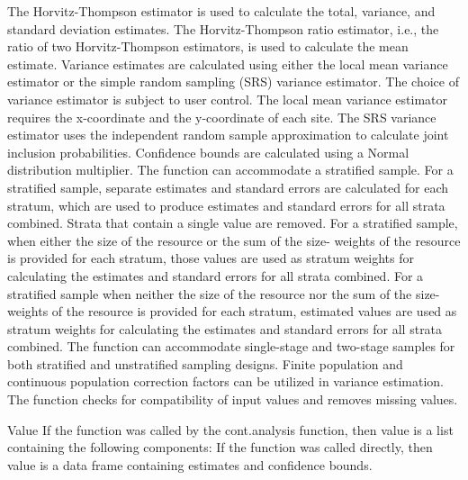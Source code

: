 \begin{Details}\relax
The Horvitz-Thompson estimator is used to calculate the total, variance, and 
standard deviation estimates.  The Horvitz-Thompson ratio estimator, i.e., the 
ratio of two Horvitz-Thompson estimators, is used to calculate the mean 
estimate.  Variance estimates are calculated using either the local mean 
variance estimator or the simple random sampling (SRS) variance 
estimator.  The choice of variance estimator is subject to user control.  The 
local mean variance estimator requires the x-coordinate and the 
y-coordinate of each site.  The SRS variance estimator uses the 
independent random sample approximation to calculate joint inclusion 
probabilities.  Confidence bounds are calculated using a Normal 
distribution multiplier.  The function can accommodate a stratified sample.  
For a stratified sample, separate estimates and standard errors are calculated 
for each stratum, which are used to produce estimates and standard errors for 
all strata combined.  Strata that contain a single value are removed.  For a 
stratified sample, when either the size of the resource or the sum of the size-
weights of the resource is provided for each stratum, those values are used as 
stratum weights for calculating the estimates and standard errors for all 
strata combined.  For a stratified sample when neither the size of the resource
nor the sum of the size-weights of the resource is provided for each stratum, 
estimated values are used as stratum weights for calculating the estimates and 
standard errors for all strata combined.  The function can accommodate 
single-stage and two-stage samples for both stratified and unstratified 
sampling designs.  Finite population and continuous population correction 
factors can be utilized in variance estimation.  The function checks for 
compatibility of input values and removes missing values.
\end{Details}
\begin{Section}{Value}
If the function was called by the cont.analysis function, then value is a list
containing the following components:
If the function was called directly, then value is a data frame containing
estimates and confidence bounds.
\end{Section}
